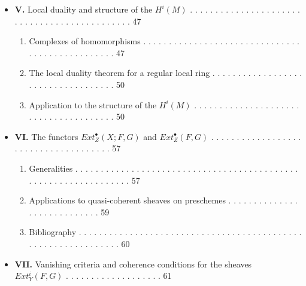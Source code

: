 \documentclass[
]{article}
\providecommand{\tightlist}{%
  \setlength{\itemsep}{0pt}\setlength{\parskip}{0pt}}
\begin{document}
\begin{itemize}
  \begin{enumerate}
  \def\labelenumi{\arabic{enumi}.}
  \tightlist
  \item
    Generalities on module functors . . . . . . . . . . . . . . . . . .
    . . . . . . . . . . . . . . . . . . . . . . . . . . . . . 33
  \item
    Characterization of exact functors . . . . . . . . . . . . . . . . .
    . . . . . . . . . . . . . . . . . . . . . . . . . . . . 36
  \item
    Study of the case where \(T\) is left exact and \(T(M)\) is of
    finite type for every \(M\) . . . . . . . . . . . 37
  \item
    Dualizing module; dualizing functor . . . . . . . . . . . . . . . .
    . . . . . . . . . . . . . . . . . . . . . . . . . . . . 39
  \item
    Consequences of the theory of dualizing modules . . . . . . . . . .
    . . . . . . . . . . . . . . . . . . . . . . 43
  \end{enumerate}
\item
  \textbf{V.} Local duality and structure of the \(H^{i}(M)\) . . . . .
  . . . . . . . . . . . . . . . . . . . . . . . . . . . . . . . . . . .
  . . . . . 47

  \begin{enumerate}
  \def\labelenumi{\arabic{enumi}.}
  \tightlist
  \item
    Complexes of homomorphisms . . . . . . . . . . . . . . . . . . . . .
    . . . . . . . . . . . . . . . . . . . . . . . . . . . 47
  \item
    The local duality theorem for a regular local ring . . . . . . . . .
    . . . . . . . . . . . . . . . . . . . . . . . . . . 50
  \item
    Application to the structure of the \(H^{i}(M)\) . . . . . . . . . .
    . . . . . . . . . . . . . . . . . . . . . . . . . . . . 50
  \end{enumerate}
\item
  \textbf{VI.} The functors \(Ext^{\bullet}_{Z}(X; F, G)\) and
  \(Ext^{\bullet}_{Z}(F, G)\) . . . . . . . . . . . . . . . . . . . . .
  . . . . . . . . . . . . . . . . 57

  \begin{enumerate}
  \def\labelenumi{\arabic{enumi}.}
  \tightlist
  \item
    Generalities . . . . . . . . . . . . . . . . . . . . . . . . . . . .
    . . . . . . . . . . . . . . . . . . . . . . . . . . . . . . . . . .
    . . 57
  \item
    Applications to quasi-coherent sheaves on preschemes . . . . . . . .
    . . . . . . . . . . . . . . . . . . . . 59
  \item
    Bibliography . . . . . . . . . . . . . . . . . . . . . . . . . . . .
    . . . . . . . . . . . . . . . . . . . . . . . . . . . . . . . . . .
    60
  \end{enumerate}
\item
  \textbf{VII.} Vanishing criteria and coherence conditions for the
  sheaves \(Ext^{i}_{Y}(F, G)\) . . . . . . . . . . . . . . . . . . . 61


\end{itemize}
\end{document}

